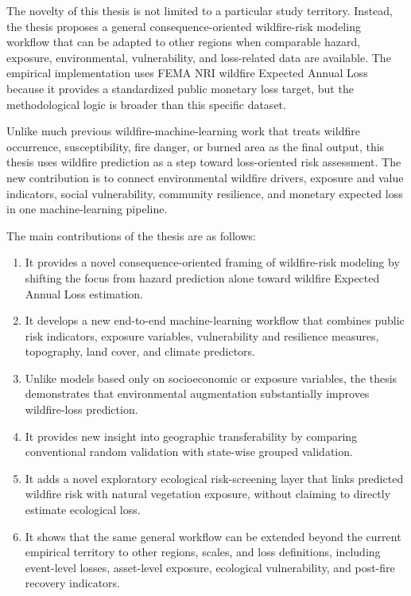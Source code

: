 The novelty of this thesis is not limited to a particular study territory. Instead, the thesis proposes a general consequence-oriented wildfire-risk modeling workflow that can be adapted to other regions when comparable hazard, exposure, environmental, vulnerability, and loss-related data are available. The empirical implementation uses FEMA NRI wildfire Expected Annual Loss because it provides a standardized public monetary loss target, but the methodological logic is broader than this specific dataset.

Unlike much previous wildfire-machine-learning work that treats wildfire occurrence, susceptibility, fire danger, or burned area as the final output, this thesis uses wildfire prediction as a step toward loss-oriented risk assessment. The new contribution is to connect environmental wildfire drivers, exposure and value indicators, social vulnerability, community resilience, and monetary expected loss in one machine-learning pipeline.

The main contributions of the thesis are as follows:

\begin{enumerate}
    \item It provides a novel consequence-oriented framing of wildfire-risk modeling by shifting the focus from hazard prediction alone toward wildfire Expected Annual Loss estimation.
    
    \item It develops a new end-to-end machine-learning workflow that combines public risk indicators, exposure variables, vulnerability and resilience measures, topography, land cover, and climate predictors.
    
    \item Unlike models based only on socioeconomic or exposure variables, the thesis demonstrates that environmental augmentation substantially improves wildfire-loss prediction.
    
    \item It provides new insight into geographic transferability by comparing conventional random validation with state-wise grouped validation.
    
    \item It adds a novel exploratory ecological risk-screening layer that links predicted wildfire risk with natural vegetation exposure, without claiming to directly estimate ecological loss.
    
    \item It shows that the same general workflow can be extended beyond the current empirical territory to other regions, scales, and loss definitions, including event-level losses, asset-level exposure, ecological vulnerability, and post-fire recovery indicators.
\end{enumerate}

